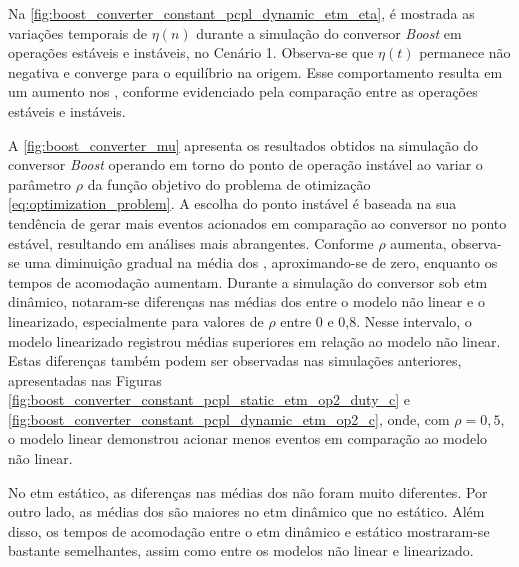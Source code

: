 Na \autoref{fig:boost_converter_constant_pcpl_dynamic_etm_eta}, é mostrada as variações temporais de $\eta(n)$ durante a simulação do conversor \textit{Boost }em operações estáveis e instáveis, no Cenário 1. Observa-se que $\eta(t)$ permanece não negativa e converge para o equilíbrio na origem. Esse comportamento resulta em um aumento nos , conforme evidenciado pela comparação entre as operações estáveis e instáveis.

A \autoref{fig:boost_converter_mu} apresenta os resultados obtidos na simulação do conversor \textit{Boost }operando em torno do ponto de operação instável ao variar o parâmetro $\rho$ da função objetivo do problema de otimização \eqref{eq:optimization_problem}. A escolha do ponto instável é baseada na sua tendência de gerar mais eventos acionados em comparação ao conversor no ponto estável, resultando em análises mais abrangentes.  Conforme $\rho$ aumenta, observa-se uma diminuição gradual na média dos , aproximando-se de zero, enquanto os tempos de acomodação aumentam. Durante a simulação do conversor sob \acrshort{etm} dinâmico, notaram-se diferenças nas médias dos  entre o modelo não linear e o linearizado, especialmente para valores de $\rho$ entre 0 e 0,8. Nesse intervalo, o modelo linearizado registrou médias superiores em relação ao modelo não linear. Estas diferenças também podem ser observadas nas simulações anteriores, apresentadas nas Figuras \ref{fig:boost_converter_constant_pcpl_static_etm_op2_duty_c} e \ref{fig:boost_converter_constant_pcpl_dynamic_etm_op2_c}, onde, com $\rho = 0,5$, o modelo linear demonstrou acionar menos eventos em comparação ao modelo não linear. 

No \acrshort{etm} estático, as diferenças nas médias dos  não foram muito diferentes. Por outro lado, as médias dos  são maiores no \acrshort{etm} dinâmico que no estático. Além disso, os tempos de acomodação entre o \acrshort{etm} dinâmico e estático mostraram-se bastante semelhantes, assim como entre os modelos não linear e linearizado.

